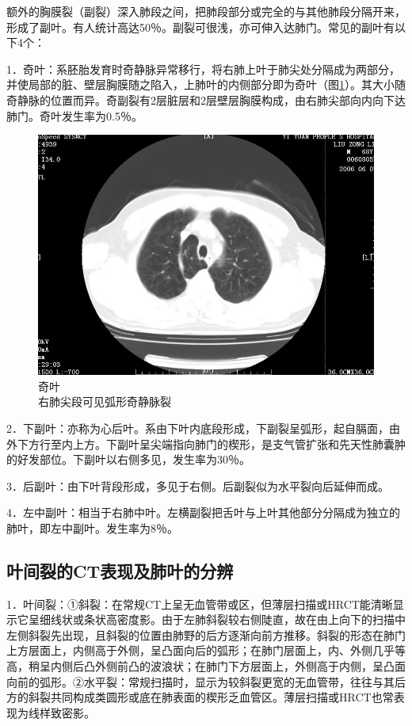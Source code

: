 额外的胸膜裂（副裂）深入肺段之间，把肺段部分或完全的与其他肺段分隔开来，形成了副叶。有人统计高达50％。副裂可很浅，亦可伸入达肺门。常见的副叶有以下4个：

1．奇叶：系胚胎发育时奇静脉异常移行，将右肺上叶于肺尖处分隔成为两部分，并使局部的脏、壁层胸膜随之陷入，上肺叶的内侧部分即为奇叶（图\ref{fig9-2}）。其大小随奇静脉的位置而异。奇副裂有2层脏层和2层壁层胸膜构成，由右肺尖部向内向下达肺门。奇叶发生率为0.5％。

\begin{figure}[!htbp]
 \centering
 \includegraphics[width=.7\textwidth,height=\textheight,keepaspectratio]{./images/Image00185.jpg}
 \captionsetup{justification=centering}
 \caption{奇叶\\{\small 右肺尖段可见弧形奇静脉裂}}
 \label{fig9-2}
  \end{figure} 

2．下副叶：亦称为心后叶。系由下叶内底段形成，下副裂呈弧形，起自膈面，由外下方行至内上方。下副叶呈尖端指向肺门的楔形，是支气管扩张和先天性肺囊肿的好发部位。下副叶以右侧多见，发生率为30％。

3．后副叶：由下叶背段形成，多见于右侧。后副裂似为水平裂向后延伸而成。

4．左中副叶：相当于右肺中叶。左横副裂把舌叶与上叶其他部分分隔成为独立的肺叶，即左中副叶。发生率为8％。

\subsection{叶间裂的CT表现及肺叶的分辨}

1．叶间裂：①斜裂：在常规CT上呈无血管带或区，但薄层扫描或HRCT能清晰显示它呈细线状或条状高密度影。由于左肺斜裂较右侧陡直，故在由上向下的扫描中左侧斜裂先出现，且斜裂的位置由肺野的后方逐渐向前方推移。斜裂的形态在肺门上方层面上，内侧高于外侧，呈凸面向后的弧形；在肺门层面上，内、外侧几乎等高，稍呈内侧后凸外侧前凸的波浪状；在肺门下方层面上，外侧高于内侧，呈凸面向前的弧形。②水平裂：常规扫描时，显示为较斜裂更宽的无血管带，往往与其后方的斜裂共同构成类圆形或底在肺表面的楔形乏血管区。薄层扫描或HRCT也常表现为线样致密影。

